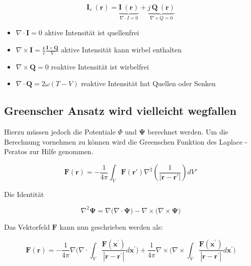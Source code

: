 \begin{equation}
\mathbf{I}_c ~(\mathbf{r}) = \underbrace{\mathbf{I}~(\mathbf{r})}_{\nabla \cdot I = 0} + \underbrace{j\,\mathbf{Q}~(\mathbf{r})}_{\nabla \times Q = 0}
\label{helmholtz:KomplexeIntensitaet_Zerlegung}
\end{equation}

\begin{itemize}
\item $\nabla \cdot \mathbf{I} = 0$ aktive Intensität ist quellenfrei
\item $\nabla \times \mathbf{I} = \frac{k}{c} \frac{\mathbf{I} \times \mathbf{Q}}{V}$ aktive Intensität kann wirbel enthalten
\item $\nabla \times \mathbf{Q} = 0$ reaktive Intensität ist wirbelfrei
\item $\nabla \cdot \mathbf{Q} = 2 \omega (T-V)$ reaktive Intensität hat Quellen oder Senken
\end{itemize}


\subsection{Greenscher Ansatz wird vielleicht wegfallen}
Hierzu müssen jedoch die Potentiale $\Phi $ und $\mathbf{\Psi}$ berechnet werden. Um die Berechnung vornehmen zu können wird die Greenschen Funktion des Laplace -Peratos zur Hilfe genommen. 

\begin{equation}
\mathbf{F}(\mathbf{r}) = -\frac{1}{4\pi} \int_V \mathbf{F}(\mathbf{r}') \nabla^2 \left( \frac{1}{|\mathbf{r} - \mathbf{r}'|} \right) dV'
\end{equation}

Die Identität

\begin{equation}
\nabla^2 \mathbf{\Psi}=\nabla \Big( \nabla \cdot \mathbf{\Psi} \Big)-\nabla \times \Big(\nabla \times \mathbf{\Psi} \Big)
\end{equation}

Das Vektorfeld $\mathbf{F}$ kann nun geschrieben werden als:

\begin{equation}
\mathbf{F}(\mathbf{r}) = - \frac{1}{4 \pi} \nabla \bigg( \nabla \cdot \int_V \frac{\mathbf{F}(\mathbf{x}^{\prime})}{|\mathbf{r} - \mathbf{r}^{\prime}|} d\mathbf{x}^{\prime} \bigg) + \frac{1}{4 \pi} \nabla \times \bigg( \nabla \times \int_V \frac{\mathbf{F}(\mathbf{x}^{\prime})}{|\mathbf{r} - \mathbf{r}^{\prime}|} d\mathbf{x}^{\prime} \bigg)
\end{equation}


